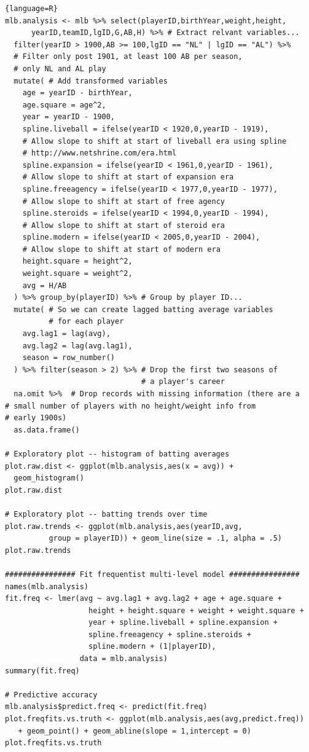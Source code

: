 \documentclass[10pt,a4paper]{article}
\begin{document}
\begin{lstlisting}{language=R}
mlb.analysis <- mlb %>% select(playerID,birthYear,weight,height,
      yearID,teamID,lgID,G,AB,H) %>% # Extract relvant variables...
  filter(yearID > 1900,AB >= 100,lgID == "NL" | lgID == "AL") %>% 
  # Filter only post 1901, at least 100 AB per season, 
  # only NL and AL play
  mutate( # Add transformed variables
    age = yearID - birthYear,
    age.square = age^2,
    year = yearID - 1900,
    spline.liveball = ifelse(yearID < 1920,0,yearID - 1919), 
    # Allow slope to shift at start of liveball era using spline 
    # http://www.netshrine.com/era.html
    spline.expansion = ifelse(yearID < 1961,0,yearID - 1961), 
    # Allow slope to shift at start of expansion era
    spline.freeagency = ifelse(yearID < 1977,0,yearID - 1977), 
    # Allow slope to shift at start of free agency
    spline.steroids = ifelse(yearID < 1994,0,yearID - 1994), 
    # Allow slope to shift at start of steroid era
    spline.modern = ifelse(yearID < 2005,0,yearID - 2004), 
    # Allow slope to shift at start of modern era
    height.square = height^2,
    weight.square = weight^2,
    avg = H/AB
  ) %>% group_by(playerID) %>% # Group by player ID...
  mutate( # So we can create lagged batting average variables 
          # for each player
    avg.lag1 = lag(avg),
    avg.lag2 = lag(avg.lag1),
    season = row_number()
  ) %>% filter(season > 2) %>% # Drop the first two seasons of 
                               # a player's career
  na.omit %>%  # Drop records with missing information (there are a 
# small number of players with no height/weight info from 
# early 1900s)
  as.data.frame()

# Exploratory plot -- histogram of batting averages
plot.raw.dist <- ggplot(mlb.analysis,aes(x = avg)) +
  geom_histogram()
plot.raw.dist

# Exploratory plot -- batting trends over time
plot.raw.trends <- ggplot(mlb.analysis,aes(yearID,avg, 
          group = playerID)) + geom_line(size = .1, alpha = .5) 
plot.raw.trends

################ Fit frequentist multi-level model ################
names(mlb.analysis)
fit.freq <- lmer(avg ~ avg.lag1 + avg.lag2 + age + age.square + 
                   height + height.square + weight + weight.square + 
                   year + spline.liveball + spline.expansion + 
                   spline.freeagency + spline.steroids + 
                   spline.modern + (1|playerID),
                 data = mlb.analysis)
summary(fit.freq)

# Predictive accuracy
mlb.analysis$predict.freq <- predict(fit.freq)
plot.freqfits.vs.truth <- ggplot(mlb.analysis,aes(avg,predict.freq)) 
   + geom_point() + geom_abline(slope = 1,intercept = 0)
plot.freqfits.vs.truth


\end{lstlisting}
\end{document}
